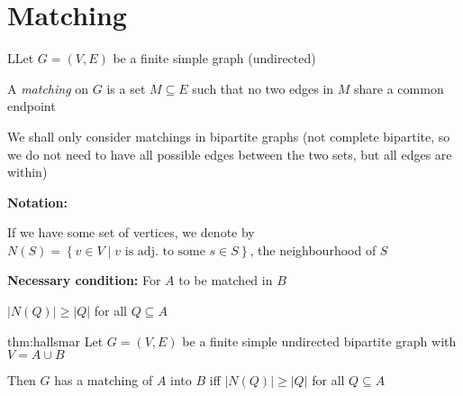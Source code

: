 \section{Matching}\par
\begin{theo}
  LLet $G = (V,E)$ be a finite simple graph (undirected)
  \par\bigskip
  \noindent A \textit{matching} on $G$ is a set $M\subseteq E$ such that no two edges in $M$ share a common endpoint
\end{theo}
\par\bigskip
\noindent We shall only consider matchings in bipartite graphs (not complete bipartite, so we do not need to have all possible edges between the two sets, but all edges are within)
\par\bigskip
\noindent\textbf{Notation:}\par
\noindent If we have some set of vertices, we denote by $N(S) = \left\{v\in V\;|\;\text{$v$ is adj. to some $s\in S$}\right\}$, the neighbourhood of $S$
\par\bigskip
\noindent\textbf{Necessary condition:} For $A$ to be matched in $B$\par
\noindent $\left|N(Q)\right|\geq \left|Q\right|$ for all $Q\subseteq A$
\par\bigskip
\begin{theo}{thm:hallsmar}
  Let $G = (V,E)$ be a finite simple undirected bipartite graph with $V = A\cup B$ 
  \par\bigskip
  \noindent Then $G$ has a matching of $A$ into $B$ iff $\left|N(Q)\right|\geq\left|Q\right|$ for all $Q\subseteq A$
\end{theo}
\par\bigskip
